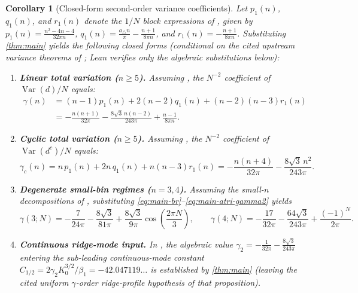 \documentclass[11pt,a4paper]{article}
\numberwithin{equation}{section}
\theoremstyle{plain}
\newtheorem{corollary}[theorem]{Corollary}
\theoremstyle{definition}
\theoremstyle{remark}
\DeclareMathOperator{\Var}{Var}
\newcommand{\tri}{a_{\triangle}}
\begin{document}
\begin{corollary}[Closed-form second-order variance coefficients]
\label{cor:variance}
Let $p_1(n)$, $q_1(n)$, and $r_1(n)$ denote the $1/N$ block expressions of \cite[Theorem~7.6]{banic_elezovic_p2}, given by $p_1(n)=\frac{n^2-4n-4}{32\pi n}$, $q_1(n)=\frac{\tri n}{\pi}-\frac{n+1}{8\pi n}$, and $r_1(n)=-\frac{n+1}{8\pi n}$. Substituting \cref{thm:main} yields the following closed forms (conditional on the cited upstream variance theorems of \cite{banic_elezovic_p2,banic_elezovic_p5}; Lean verifies only the algebraic substitutions below):
\begin{enumerate}[label=(\roman*)]
  \item \textbf{Linear total variation ($n\ge 5$).} Assuming \cite[Theorem~7.6]{banic_elezovic_p2}, the $N^{-2}$ coefficient of $\Var(d)/N$ equals:
  \begin{equation}\label{eq:gamma-linear}
  \begin{aligned}
    \gamma(n)
    &= (n-1)p_1(n) + 2(n-2)q_1(n) + (n-2)(n-3)r_1(n)\\
    &= -\frac{n(n+1)}{32\pi} - \frac{8\sqrt{3}\,n(n-2)}{243\pi} + \frac{n-1}{8\pi n}.
  \end{aligned}
  \end{equation}
  \item \textbf{Cyclic total variation ($n\ge 5$).} Assuming \cite[Theorem~3.10]{banic_elezovic_p5}, the $N^{-2}$ coefficient of $\Var(d^c)/N$ equals:
  \begin{equation}\label{eq:gamma-cyclic}
    \gamma_c(n)
    = n\,p_1(n) + 2n\,q_1(n) + n(n-3)r_1(n)
    = -\frac{n(n+4)}{32\pi} - \frac{8\sqrt{3}\,n^2}{243\pi}.
  \end{equation}
  \item \textbf{Degenerate small-bin regimes ($n=3,4$).} Assuming the small-$n$ decompositions of \cite[\S 7.2 and \S 8]{banic_elezovic_p2}, substituting \eqref{eq:main-br}--\eqref{eq:main-atri-gamma2} yields
  \[
    \gamma(3;N) = -\frac{7}{24\pi} - \frac{8\sqrt{3}}{81\pi} + \frac{8\sqrt{3}}{9\pi}\cos\!\left(\frac{2\pi N}{3}\right),
    \qquad
    \gamma(4;N) = -\frac{17}{32\pi} - \frac{64\sqrt{3}}{243\pi} + \frac{(-1)^N}{2\pi}.
  \]
  \item \textbf{Continuous ridge-mode input.} In \cite[Proposition~4.2]{banic_elezovic_p5}, the algebraic value $\gamma_2=-\frac{1}{32\pi}-\frac{8\sqrt{3}}{243\pi}$ entering the sub-leading continuous-mode constant $C_{1/2}=2\gamma_2 K_0^{3/2}/\beta_1 = -42.047119\ldots$ is established by \cref{thm:main} (leaving the cited uniform $\gamma$-order ridge-profile hypothesis of that proposition).
\end{enumerate}
\end{corollary}
\end{document}
